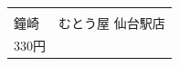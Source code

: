 \begin{table}[H]
\begin{tabular}{ll}
\begin{minipage}{0.45\textwidth}
		\end{minipage} \\
				\begin{minipage}{0.45\textwidth}
			\centering
			{\scriptsize{鐘崎}}
		\end{minipage} & 
		\begin{minipage}{0.45\textwidth}
			\centering
			{\scriptsize{むとう屋 仙台駅店}}
		\end{minipage} \\
		\begin{minipage}{0.45\textwidth}
			\centering
			{\scriptsize{330円}}
		\end{minipage} & 
		\begin{minipage}{0.45\textwidth}
			\centering
			{\scriptsize{}}
		\end{minipage} \\
	\end{tabular}
\end{table}
